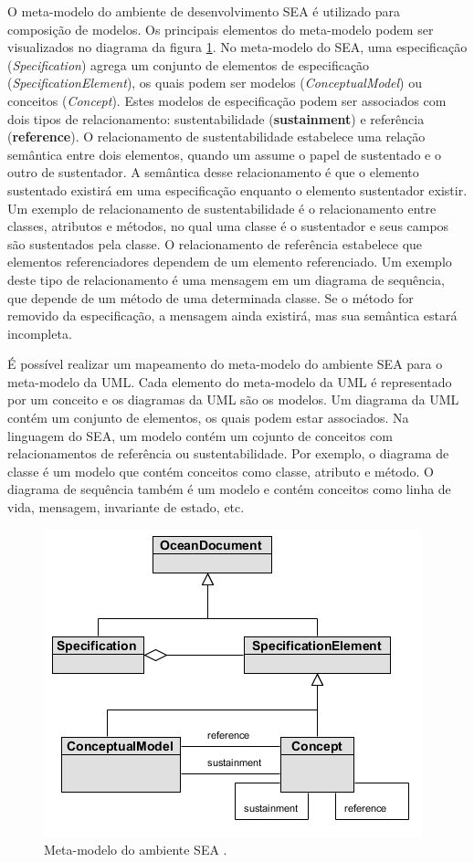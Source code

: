 O meta-modelo do ambiente de desenvolvimento SEA \cite{silva:00} é utilizado para composição de modelos. Os principais elementos do meta-modelo podem ser
visualizados no diagrama da figura \ref{fig:sea_meta_model}. No meta-modelo do SEA, uma especificação (\textit{Specification}) agrega um conjunto de elementos de
especificação (\textit{SpecificationElement}), os quais podem ser modelos (\textit{ConceptualModel}) ou conceitos (\textit{Concept}). Estes modelos
de especificação podem ser associados com dois tipos de relacionamento: sustentabilidade (\textbf{sustainment}) e referência (\textbf{reference}). O
relacionamento de sustentabilidade estabelece uma relação semântica entre dois elementos, quando um assume o papel de sustentado e o outro de
sustentador. A semântica desse relacionamento é que o elemento sustentado existirá em uma especificação enquanto o elemento sustentador existir.
Um exemplo de relacionamento de sustentabilidade é o relacionamento entre classes, atributos e métodos, no qual uma classe é o sustentador e seus
campos são sustentados pela classe. O relacionamento de referência estabelece que elementos referenciadores dependem de um elemento referenciado. Um
exemplo deste tipo de relacionamento é uma mensagem em um diagrama de sequência, que depende de um método de uma determinada classe. Se o método for
removido da especificação, a mensagem ainda existirá, mas sua semântica estará incompleta.

É possível realizar um mapeamento do meta-modelo do ambiente SEA para o meta-modelo da UML. Cada elemento do meta-modelo da UML é representado por um
conceito e os diagramas da UML são os modelos. Um diagrama da UML contém um conjunto de elementos, os quais podem estar associados. Na linguagem do
SEA, um modelo contém um cojunto de conceitos com relacionamentos de referência ou sustentabilidade. Por exemplo, o diagrama de classe é um modelo que
contém conceitos como classe, atributo e método. O diagrama de sequência também é um modelo e contém conceitos como linha de vida, mensagem,
invariante de estado, etc.

  \begin{figure}[!h]
	\centering
	\includegraphics{img/sea_meta_model.png}
	\caption{Meta-modelo do ambiente SEA \cite{silva:00}.}\label{fig:sea_meta_model}
  \end{figure}
  
